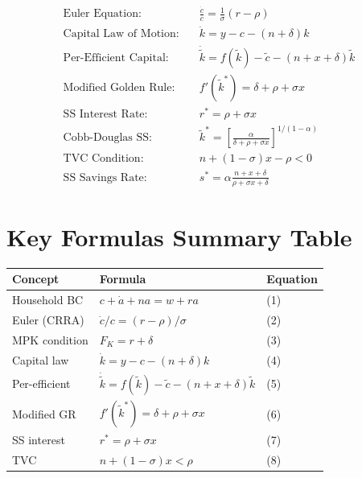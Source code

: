 \documentclass[a4paper,11pt]{article}
\newcommand{\ktilde}{\tilde{k}}
\newcommand{\ctilde}{\tilde{c}}
\begin{document}
\begin{resultbox}
\begin{align*}
\text{Euler Equation:} & \quad \frac{\dot{c}}{c} = \frac{1}{\sigma}(r - \rho) \\
\text{Capital Law of Motion:} & \quad \dot{k} = y - c - (n + \delta)k \\
\text{Per-Efficient Capital:} & \quad \dot{\ktilde} = f(\ktilde) - \ctilde - (n + x + \delta)\ktilde \\
\text{Modified Golden Rule:} & \quad f'(\ktilde^*) = \delta + \rho + \sigma x \\
\text{SS Interest Rate:} & \quad r^* = \rho + \sigma x \\
\text{Cobb-Douglas SS:} & \quad \ktilde^* = \left[\frac{\alpha}{\delta + \rho + \sigma x}\right]^{1/(1-\alpha)} \\
\text{TVC Condition:} & \quad n + (1-\sigma)x - \rho < 0 \\
\text{SS Savings Rate:} & \quad s^* = \alpha \frac{n + x + \delta}{\rho + \sigma x + \delta}
\end{align*}
\end{resultbox}

\section{Key Formulas Summary Table}

\begin{center}
\begin{tabular}{lll}
\toprule
Concept & Formula & Equation \\
\midrule
Household BC & $c + \dot{a} + na = w + ra$ & (1) \\
Euler (CRRA) & $\dot{c}/c = (r - \rho)/\sigma$ & (2) \\
MPK condition & $F_K = r + \delta$ & (3) \\
Capital law & $\dot{k} = y - c - (n+\delta)k$ & (4) \\
Per-efficient & $\dot{\ktilde} = f(\ktilde) - \ctilde - (n+x+\delta)\ktilde$ & (5) \\
Modified GR & $f'(\ktilde^*) = \delta + \rho + \sigma x$ & (6) \\
SS interest & $r^* = \rho + \sigma x$ & (7) \\
TVC & $n + (1-\sigma)x < \rho$ & (8) \\
\bottomrule
\end{tabular}
\end{center}
\end{document}
